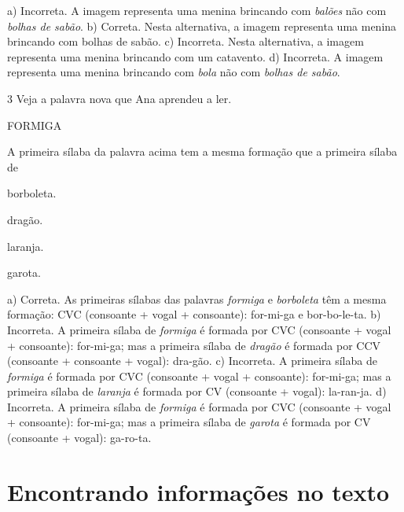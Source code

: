 
a) Incorreta. A imagem representa uma menina brincando com \textit{balões}
não com \textit{bolhas de sabão}.
b) Correta. Nesta alternativa, a imagem representa uma menina brincando
com bolhas de sabão.
c) Incorreta. Nesta alternativa, a imagem representa uma menina brincando
com um catavento.
d) Incorreta. A imagem representa uma menina brincando com \textit{bola}
não com \textit{bolhas de sabão}.

\num{3} Veja a palavra nova que Ana aprendeu a ler.

FORMIGA

A primeira sílaba da palavra acima tem a mesma formação que a 
primeira sílaba de

\begin{minipage}{.5\textwidth}
\begin{escolha}
\item borboleta.

\item dragão.

\item laranja.

\item garota.
\end{escolha}
\end{minipage}

a) Correta. As primeiras sílabas das palavras \textit{formiga} e 
\textit{borboleta} têm a mesma formação: CVC (consoante + vogal + 
consoante): for-mi-ga e bor-bo-le-ta.   
b) Incorreta. A primeira sílaba de \textit{formiga} é formada
por CVC (consoante + vogal + consoante): for-mi-ga; mas a primeira 
sílaba de \textit{dragão} é formada por CCV (consoante + consoante + 
vogal): dra-gão.
c) Incorreta. A primeira sílaba de \textit{formiga} é formada
por CVC (consoante + vogal + consoante): for-mi-ga; mas a primeira 
sílaba de \textit{laranja} é formada por CV (consoante + vogal): 
la-ran-ja.
d) Incorreta. A primeira sílaba de \textit{formiga} é formada
por CVC (consoante + vogal + consoante): for-mi-ga; mas a primeira 
sílaba de \textit{garota} é formada por CV (consoante + vogal): 
ga-ro-ta.

\chapter{Encontrando informações no texto}

